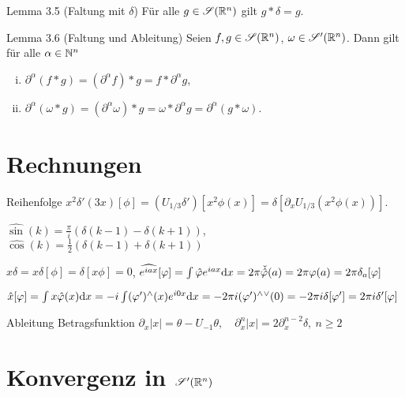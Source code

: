 \begin{namedtheorem}{Lemma 3.5 (Faltung mit $\delta$)}
  Für alle $g\in\mathscr{S}(\mathbb{R}^n)$ gilt $g\ast\delta=g$.
\end{namedtheorem}

\begin{namedtheorem}{Lemma 3.6 (Faltung und Ableitung)}
  Seien $f,g\in\mathscr{S}(\mathbb{R}^n)$, $\omega\in\mathscr{S}'(\mathbb{R}^n)$. Dann gilt für alle $\alpha\in\mathbb{N}^n$
  \begin{enumerate}[(i)]
    \item $\partial^{\alpha}(f\ast g) = (\partial^{\alpha}f)\ast g = f\ast\partial^{\alpha} g$,
    \item $\partial^{\alpha}(\omega\ast g) = (\partial^{\alpha}\omega)\ast g = \omega \ast \partial^{\alpha}g = \partial^{\alpha}(g\ast \omega)$.
  \end{enumerate}
\end{namedtheorem}

\section{Rechnungen}

Reihenfolge $x^2\delta'(3x)[\phi]=\left(U_{1/3}\delta'\right)[x^2\phi(x)]=\delta[\partial_x U_{1/3}(x^2\phi(x))]$.

$\widehat{\sin} (k) = \frac{\pi}{i}(\delta(k-1) - \delta(k+1))$, \quad\quad $\widehat{\cos} (k) = \frac1{2}(\delta(k-1) + \delta(k+1))$

$x\delta = x\delta[\phi] = \delta[x\phi] = 0$, \quad\quad $\widehat{e^{iax}}[\varphi]=\int\hat{\varphi}e^{iax}\mathrm{d}x=2\pi\check{\hat{\varphi}}(a)=2\pi \varphi(a)=2\pi\delta_a[\varphi]$

$\hat{x}[\varphi]=\int x\hat{\varphi}(x)\mathrm{d}x=-i\int(\varphi'){}^{\wedge}(x)e^{i0x}\mathrm{d}x=-2\pi i(\varphi'){}^{\wedge}{}^{\vee}(0)=-2\pi i\delta[\varphi']=2\pi i\delta'[\varphi]$

Ableitung Betragsfunktion $\partial_x |x| = \theta - U_{-1}\theta, \quad \partial_x^n |x| = 2\partial_x^{n-2}\delta,\ n\geq 2$


\section{Konvergenz in $\mathscr{S}'(\mathbb{R}^n)$}

